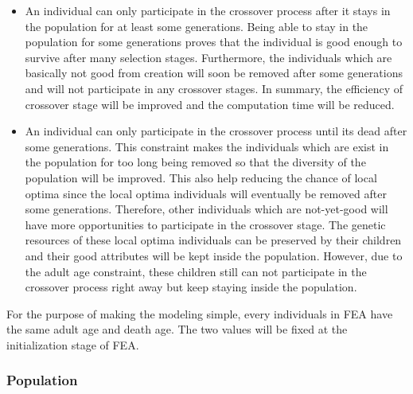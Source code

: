 \documentclass[final]{elsarticle}
\begin{document}
\begin{itemize}
	\item An individual can only participate in the crossover process after it stays in the population for at least some generations. Being able to stay in the population for some generations proves that the individual is good enough to survive after many selection stages. Furthermore, the individuals which are basically not good from creation will soon be removed after some generations and will not participate in any crossover stages. In summary, the efficiency of crossover stage will be improved and the computation time will be reduced. 
	\item An individual can only participate in the crossover process until its dead after some generations. This constraint makes the individuals which are exist in the population for too long being removed so that the diversity of the population will be improved. This also help reducing the chance of local optima since the local optima individuals will eventually be removed after some generations. Therefore, other individuals which are not-yet-good will have more opportunities to participate in the crossover stage. The genetic resources of these local optima individuals can be preserved by their children and their good attributes will be kept inside the population. However, due to the adult age constraint, these children still can not participate in the crossover process right away but keep staying inside the population.
\end{itemize}  For the purpose of making the modeling simple, every individuals in FEA have the same adult age and death age. The two values will be fixed at the initialization stage of FEA.

\subsubsection{Population}
\end{document}
